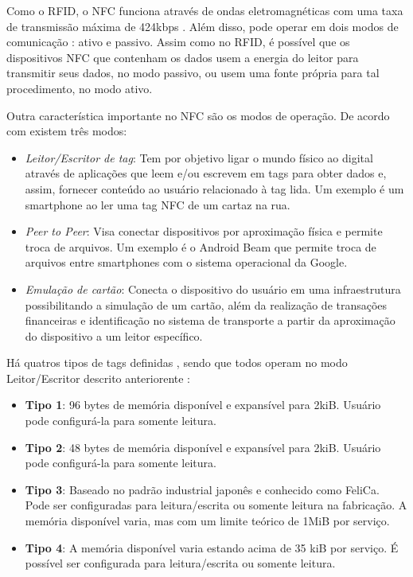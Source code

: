 \documentclass[
	article,			%
	11pt,				%
	oneside,			%
	a4paper,			%
	section=TITLE,		%
	subsection=TITLE,	%
	english,			%
	brazil,				%
	sumario=tradicional
	]{abntex2}
\begin{document}
Como o RFID, o NFC funciona através de ondas eletromagnéticas com uma taxa de transmissão máxima de 
424kbps \cite{nfcforumabout2017}. Além disso, pode operar em dois modos de comunicação 
\cite{brianjepsondoncolemantomigoe2014}: ativo e passivo. Assim como no RFID, é possível que os 
dispositivos NFC que contenham os dados usem a energia do leitor para transmitir seus dados, no 
modo passivo, ou usem uma fonte própria para tal procedimento, no modo ativo.


Outra característica importante no NFC são os modos de operação. De acordo com 
\cite{nfcforumabout2017} existem três modos:

\begin{itemize} \parskip -4pt
	\item \textit{Leitor/Escritor de tag}: Tem por objetivo ligar o mundo físico ao digital através 
	de aplicações que leem e/ou escrevem em tags para obter dados e, assim, fornecer conteúdo ao 
	usuário relacionado à tag lida. Um exemplo é um smartphone ao ler uma tag NFC de um cartaz na 
	rua.
	\item \textit{Peer to Peer}: Visa conectar dispositivos por aproximação física e permite troca 
	de arquivos. Um exemplo é o Android Beam que permite troca de arquivos entre smartphones com o 
	sistema operacional da Google.
	\item \textit{Emulação de cartão}: Conecta o dispositivo do usuário em uma infraestrutura 
	possibilitando a simulação de um cartão, além da realização de transações financeiras e 
	identificação no sistema de transporte a partir da aproximação do dispositivo a um leitor 
	específico.
\end{itemize}

Há quatros tipos de tags definidas \cite{nfcforumtypespec2017}, sendo que todos operam no modo 
Leitor/Escritor descrito anteriorente : 

\begin{itemize} \parskip -4pt
	\item \textbf{Tipo 1}: 96 bytes de memória disponível e expansível para 2kiB. Usuário pode 
	configurá-la para somente leitura.
	\item \textbf{Tipo 2}: 48 bytes de memória disponível e expansível para 2kiB. Usuário pode 
	configurá-la para somente leitura.
	\item \textbf{Tipo 3}: Baseado no padrão industrial japonês e conhecido como FeliCa. Pode ser 
	configuradas para leitura/escrita ou somente leitura na fabricação. A memória disponível varia, 
	mas com um limite teórico de 1MiB por serviço.
	\item \textbf{Tipo 4}: A memória disponível varia estando acima de 35 kiB por serviço. É 
	possível ser configurada para leitura/escrita ou somente leitura.
\end{itemize}
\end{document}
